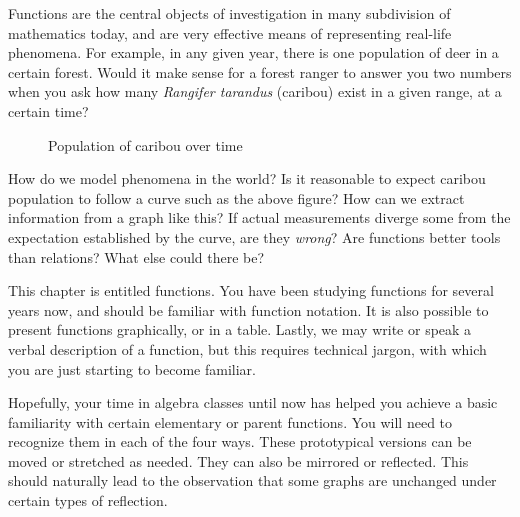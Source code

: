 


Functions are the central objects of investigation in many subdivision of mathematics today, and
are very effective means of representing real-life phenomena. For example, in any given year, 
there is one population of
deer in a certain forest.  Would it make sense for a forest ranger to answer you two numbers when
you ask how many \textit{Rangifer tarandus} (caribou) exist in a given range, at a certain time?


\begin{figure}[h]
\centering
{}
\caption{Population of caribou over time}
\end{figure}

How do we model phenomena in the world?  Is it reasonable to expect
caribou population to follow a curve such as the above figure?  How can we 
extract information from a graph like this?  If actual measurements diverge some
from the expectation established by the curve, are they \emph{wrong}?  Are functions
better tools than relations?  What else could there be?

\newpage
\chapterminitoc

This chapter is entitled functions.  You have been studying functions for several years now,
and should be familiar with function notation.  It is also possible to present functions 
graphically, or in a table.  Lastly, we may write or speak a verbal description of a function,
but this requires technical jargon, with which you are just starting to become familiar.

Hopefully, your time in algebra classes until now has helped you achieve a basic familiarity
with certain elementary or parent functions.  You will need to recognize them in each
of the four ways.  These prototypical versions can be moved or stretched as needed.  They
can also be mirrored or reflected.  This should naturally lead to the observation that some
graphs are unchanged under certain types of reflection.


